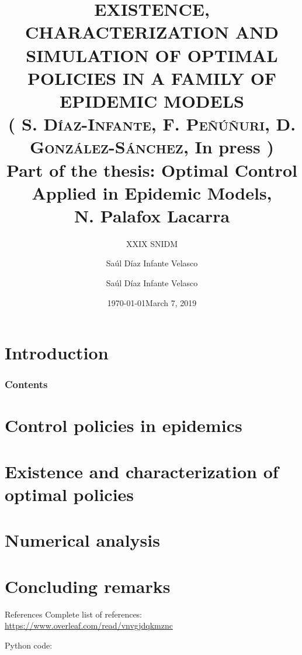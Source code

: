 \documentclass[10pt]{beamer}
\title{
    EXISTENCE, CHARACTERIZATION AND SIMULATION OF OPTIMAL
    POLICIES IN A FAMILY OF EPIDEMIC MODELS
    \\
        \small{
            (%
                \textsc{%
                    S. D\'iaz-Infante, %
                    F. Pe\~n\'u\~nuri, %
                    D. Gonz\'alez-S\'anchez}, In press%
            )\\%
        Part of the thesis:
        Optimal Control Applied in Epidemic Models,
        \\
        N. Palafox Lacarra
        \\
        }{}
}
\subtitle{XXIX SNIDM}
\date{\today}
\author{Sa\'ul D\'iaz Infante Velasco}
\institute{CONACYT-Universidad de Sonora}
\author[Sa\'ul D\'iaz Infante Velasco]{
        Sa\'ul D\'iaz Infante Velasco
    }
\date[\ccbyncsa]{March 7, 2019 }
\begin{document}
    \begin{frame}[plain]
        \maketitle
    \end{frame}
    \section{Introduction}
        
        \begin{frame}
            \frametitle{Contents}
            \tableofcontents
        \end{frame}
    \section{Control policies in epidemics}
        
        
    \section{Existence and characterization of optimal policies}
        
        
    \section{Numerical analysis}
    	
        
    \section{Concluding remarks}
        
    \begin{frame}{References}
    Complete list of references:
    \href{https://www.overleaf.com/read/vnvgjdqkmznc%
    }{https://www.overleaf.com/read/vnvgjdqkmznc}
    
    Python code:
    \nocite{python_repo}
    
    
\end{frame}
\end{document}
